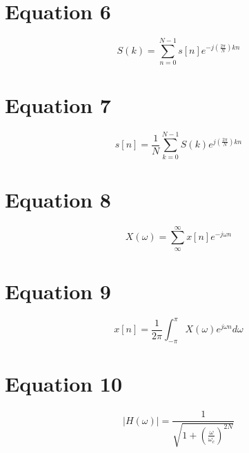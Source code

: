 \documentclass[12pt]{article}
\begin{document}
\section{Equation 6} %
\begin{equation}
    S(k) = \sum^{N-1}_{n=0} s[n]e^{-j(\frac{2\pi}{N})kn}
\end{equation}






\section{Equation 7} %
\begin{equation}
    s[n] = \frac{1}{N}\sum^{N-1}_{k=0} S(k)e^{j(\frac{2\pi}{N})kn}
\end{equation}






\section{Equation 8} %
\begin{equation}
    X(\omega) = \sum^\infty_\infty x[n]e^{-j\omega n}
\end{equation}






\section{Equation 9} %
\begin{equation}
    x[n] = \frac{1}{2\pi} \int^\pi_{-\pi} X(\omega)e^{j\omega n}d\omega
\end{equation}






\section{Equation 10} %
\begin{equation}
    |H(\omega)| = \frac{1}{\sqrt{1 + (\frac{\omega}{\omega_c})^{2N}}}
\end{equation}
\end{document}
